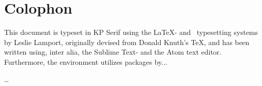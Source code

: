 
\chapter*{Colophon}
\label{cha:colophon}
This document is typeset in KP Serif using the \LaTeX - and \BibTeX\ typesetting systems by Leslie Lamport, originally devised from Donald Knuth's \TeX , and has been written using, inter alia, the Sublime Text- and the Atom text editor.
Furthermore, the environment utilizes packages by...

\ldots








